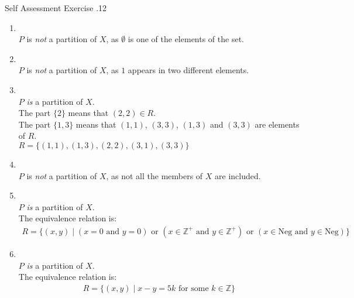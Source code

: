\documentclass[../notes.tex]{subfiles}
\begin{document}
					\begin{exercise}{Self Assessment Exercise \thechapter.12}
						\begin{enumerate}[label=(\alph*)]
							\item {}\\
								$P$ is \emph{not} a partition of $X$, as $\emptyset$ is one of the elements of the set.
							\item {}\\
								$P$ is \emph{not} a partition of $X$, as $1$ appears in two different elements.
							\item {}\\
								$P$ \emph{is} a partition of $X$.\\
								The part $\{2\}$ means that $(2, 2) \in R$.\\
								The part $\{1, 3\}$ means that $(1, 1)$, $(3, 3)$, $(1, 3)$ and $(3, 3)$ are elements of $R$.\\
								$R = \bigl\{(1, 1), (1, 3), (2, 2), (3, 1), (3, 3)\bigr\}$
							\item {}\\
								$P$ is \emph{not} a partition of $X$, as not all the members of $X$ are included.
							\item {}\\
								$P$ \emph{is} a partition of $X$.\\
								The equivalence relation is:
								\begin{align*}
									R = \bigl\{(x, y) \mid (x = 0 \text{ and } y = 0) \text{ or } (x \in \mathbb{Z}^{+} \text{ and } y \in \mathbb{Z}^{+}) \text{ or } (x \in \mathrm{Neg} \text{ and } y \in \mathrm{Neg})\bigr\}
								\end{align*}
							\item {}\\
								$P$ \emph{is} a partition of $X$.\\
								The equivalence relation is:
								\begin{align*}
									R = \bigl\{(x, y) \mid x - y = 5k \text{ for some } k \in \mathbb{Z}\bigr\}
								\end{align*}
						\end{enumerate}
					\end{exercise}
		\pagebreak
\end{document}
